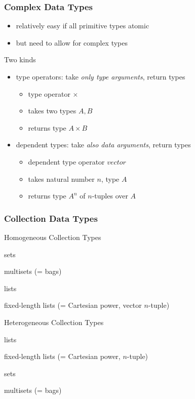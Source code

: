\begin{frame}\frametitle{Complex Data Types}
\begin{itemize}
 \item relatively easy if all primitive types atomic
 \item but need to allow for complex types
\end{itemize}

Two kinds
\begin{itemize}
\item type operators: take \emph{only type arguments}, return types
 \begin{itemize}
 \item type operator $\times$
 \item takes two types $A,B$
 \item returns type $A\times B$
 \end{itemize}
\item dependent types: take \emph{also data arguments}, return types
 \begin{itemize}
 \item dependent type operator $vector$
 \item takes natural number $n$, type $A$
 \item returns type $A^n$ of $n$-tuples over $A$
 \end{itemize}
\end{itemize}
\end{frame}

\begin{frame}\frametitle{Collection Data Types}
\begin{blockitems}{Homogeneous Collection Types}
 \item sets
 \item multisets (= bags)
 \item lists
 \item fixed-length lists (= Cartesian power, vector $n$-tuple)
\end{blockitems}

\begin{blockitems}{Heterogeneous Collection Types}
 \item lists
 \item fixed-length lists (= Cartesian power, $n$-tuple)
 \item sets
 \item multisets (= bags)
\end{blockitems}
\end{frame}

